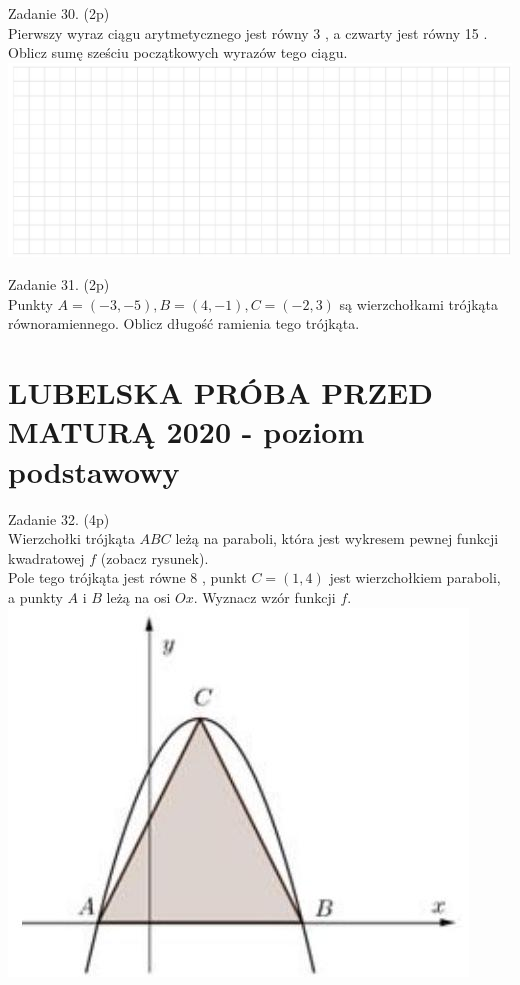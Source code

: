 \documentclass[10pt]{article}
\begin{document}
Zadanie 30. (2p)\\
Pierwszy wyraz ciągu arytmetycznego jest równy 3 , a czwarty jest równy 15 . Oblicz sumę sześciu początkowych wyrazów tego ciągu.\\
\includegraphics[max width=\textwidth, center]{2024_11_21_c2f4637e26cc7e4291d3g-10}

Zadanie 31. (2p)\\
Punkty \(A=(-3,-5), B=(4,-1), C=(-2,3)\) są wierzchołkami trójkąta równoramiennego. Oblicz długość ramienia tego trójkąta.

\section*{LUBELSKA PRÓBA PRZED MATURĄ 2020 - poziom podstawowy}
Zadanie 32. (4p)\\
Wierzchołki trójkąta \(A B C\) leżą na paraboli, która jest wykresem pewnej funkcji kwadratowej \(f\) (zobacz rysunek).\\
Pole tego trójkąta jest równe 8 , punkt \(C=(1,4)\) jest wierzchołkiem paraboli, a punkty \(A\) i \(B\) leżą na osi \(O x\). Wyznacz wzór funkcji \(f\).\\
\includegraphics[max width=\textwidth, center]{2024_11_21_c2f4637e26cc7e4291d3g-11}
\end{document}
